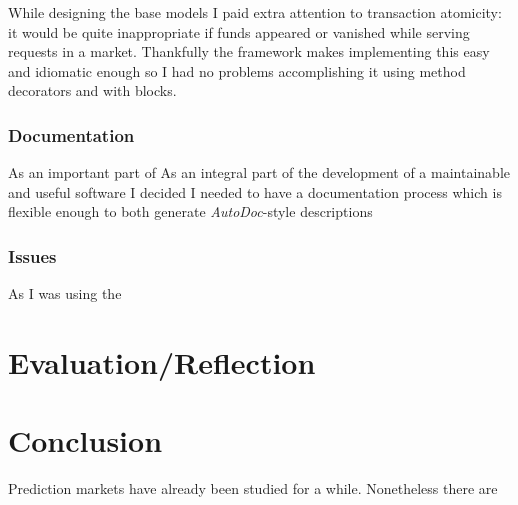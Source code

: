 \documentclass[bsc,frontabs,twoside,singlespacing,parskip,deptreport]{infthesis}     %
\begin{document}
    While designing the base models I paid extra attention to transaction atomicity: it would be quite inappropriate if funds appeared or vanished while serving requests in a market. Thankfully the framework makes implementing this easy and idiomatic enough so I had no problems accomplishing it using method decorators and with blocks.

\subsection{Documentation}
    As an important part of 
    As an integral part of the development of a maintainable and useful software I decided I needed to have a documentation process which is flexible enough to both generate {\em AutoDoc}-style descriptions   
    
\subsection{Issues}
    As I was using the 
\chapter{Evaluation/Reflection}

\chapter{Conclusion}
	Prediction markets have already been studied for a while. Nonetheless there are 






\end{document}
